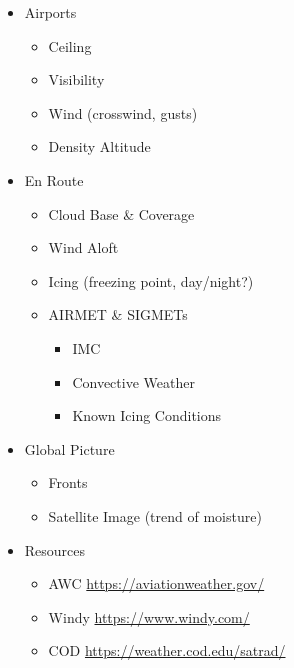 \documentclass[10pt]{article}
\begin{document}
\begin{multicols*}{2}
\begin{itemize}
\item Airports

\begin{itemize}
\item Ceiling

\item Visibility

\item Wind (crosswind, gusts)

\item Density Altitude
\end{itemize}

\item En Route

\begin{itemize}
\item Cloud Base \& Coverage

\item Wind Aloft

\item Icing (freezing point, day/night?)

\item AIRMET \& SIGMETs

\begin{itemize}
\item IMC

\item Convective Weather

\item Known Icing Conditions
\end{itemize}
\end{itemize}

\item Global Picture

\begin{itemize}
\item Fronts

\item Satellite Image (trend of moisture)
\end{itemize}

\item Resources

\begin{itemize}
\item AWC \url{https://aviationweather.gov/}

\item Windy \url{https://www.windy.com/}

\item COD \url{https://weather.cod.edu/satrad/}
\end{itemize}
\end{itemize}



\end{multicols*}
\end{document}
